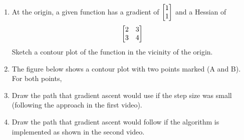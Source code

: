 \documentclass[M3_Night4_Solutions]{subfiles}
\begin{document}
\begin{enumerate}[resume=exercises, label=\textbf{Exercise} (\arabic*)]
\item At the origin, a given function has a gradient of $\begin{bmatrix} 1 \\ 1 \end{bmatrix}$ and a Hessian of 
\[ \begin{bmatrix} 2 & 3 \\ 3 & 4\end{bmatrix} \]
Sketch a contour plot of the function in the vicinity of the origin.

\clearpage
\item The figure below shows a contour plot with two points marked (A and B).  For both points, 

\be
\item Draw the path that gradient ascent would use if the step size was small (following the approach in the first video).
\item Draw the path that gradient ascent would follow if the algorithm is implemented as shown in the second video. 



\end{enumerate}
\end{document}
